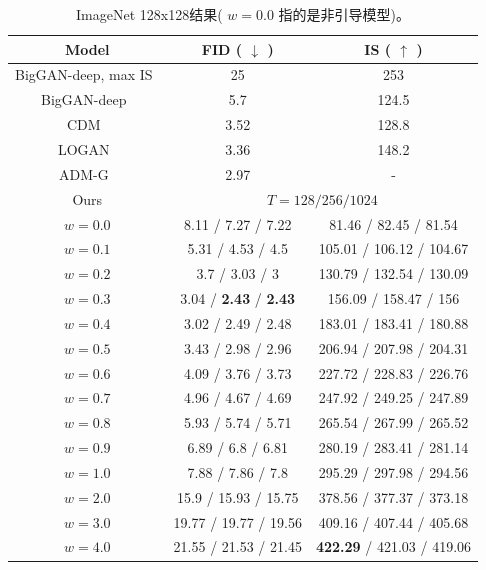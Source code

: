 \documentclass{article}
\begin{document}
 \begin{table}[!htb]
\centering\small
\begin{tabular}{c|c|c}
\toprule
Model & FID (    $\downarrow$    ) & IS (    $\uparrow$    )  \\ 
\midrule
BigGAN-deep, max IS~\citep{brock2018large} & 25 & 253  \\ 
BigGAN-deep~\citep{brock2018large} & 5.7 & 124.5  \\ 
CDM~\citep{ho2021cascaded} & 3.52 & 128.8  \\ 
LOGAN~\citep{wu2019logan} & 3.36 & 148.2  \\ 
ADM-G~\citep{dhariwal2021diffusion} & 2.97 & -  \\ 
\midrule
Ours & \multicolumn{2}{c}{    $T=128/256/1024$    }  \\ 
    $w=0.0$      & 8.11 / 7.27 / 7.22    &    81.46 / 82.45 / 81.54  \\ 
    $w=0.1$      & 5.31 / 4.53 / 4.5    &    105.01 / 106.12 / 104.67  \\ 
    $w=0.2$      & 3.7 / 3.03 / 3    &    130.79 / 132.54 / 130.09  \\ 
    $w=0.3$      & 3.04 / \textbf{2.43} / \textbf{2.43}    &    156.09 / 158.47 / 156  \\ 
    $w=0.4$      & 3.02 / 2.49 / 2.48    &    183.01 / 183.41 / 180.88  \\ 
    $w=0.5$      & 3.43 / 2.98 / 2.96    &    206.94 / 207.98 / 204.31  \\ 
    $w=0.6$      & 4.09 / 3.76 / 3.73    &    227.72 / 228.83 / 226.76  \\ 
    $w=0.7$      & 4.96 / 4.67 / 4.69    &    247.92 / 249.25 / 247.89  \\ 
    $w=0.8$      & 5.93 / 5.74 / 5.71    &    265.54 / 267.99 / 265.52  \\ 
    $w=0.9$      & 6.89 / 6.8 / 6.81    &    280.19 / 283.41 / 281.14  \\ 
    $w=1.0$      & 7.88 / 7.86 / 7.8    &    295.29 / 297.98 / 294.56  \\ 
    $w=2.0$      & 15.9 / 15.93 / 15.75    &    378.56 / 377.37 / 373.18  \\ 
    $w=3.0$      & 19.77 / 19.77 / 19.56    &    409.16 / 407.44 / 405.68  \\ 
    $w=4.0$      & 21.55 / 21.53 / 21.45    &    \textbf{422.29} / 421.03 / 419.06  \\ 
\bottomrule
\end{tabular}
\caption{
ImageNet 128x128结果( $w=0.0$ 指的是非引导模型)。}
\label{table:i128}
\end{table} 
\end{document}
